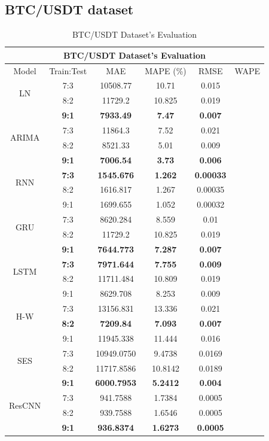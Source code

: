\documentclass{ieeeojies}
\begin{document}
\subsection{BTC/USDT dataset} 
\begin{table}[H]
    \centering
    \begin{tabular}{|c|c|c|c|c|c|}
         \hline
         \multicolumn{6}{|c|}{\textbf{BTC/USDT Dataset's Evaluation}}\\
         \hline
         \centering Model & Train:Test & MAE & MAPE (\%) & RMSE & WAPE\\
         \hline
         \multirow{2}{*}{LN} & 7:3 & 10508.77 & 10.71 & 0.015 \\ & 8:2 & 11729.2 & 10.825 & 0.019 \\ & \textbf{9:1} & \textbf{7933.49} & \textbf{7.47} & \textbf{0.007}\\
         \hline
         \multirow{2}{*}{ARIMA} & 7:3&11864.3&7.52&0.021\\ & 8:2&8521.33&5.01&0.009 \\ & \textbf{9:1} & \textbf{7006.54} & \textbf{3.73} & \textbf{0.006}\\
         \hline
         \multirow{2}{*}{RNN} & \textbf{7:3}	& \textbf{1545.676} & \textbf{1.262} & \textbf{0.00033} \\ & 8:2 & 1616.817 & 1.267 & 0.00035 \\ & 9:1 & 1699.655  & 1.052 & 0.00032\\
         \hline
         \multirow{2}{*}{GRU} & 7:3 &  8620.284 &  8.559 & 0.01 \\ & 8:2 &  11729.2 & 10.825 & 0.019 \\ & \textbf{9:1} & \textbf{7644.773}  & \textbf{7.287} & \textbf{0.007}\\
         \hline
         \multirow{2}{*}{LSTM} & \textbf{7:3}	& \textbf{7971.644} & \textbf{7.755} & \textbf{0.009} \\ & 8:2 & 11711.484 & 10.809 & 0.019 \\ & 9:1 & 8629.708 & 8.253 & 0.009\\
         \hline
         \multirow{2}{*}{H-W} & 7:3 & 13156.831&13.336 & 0.021 \\ & \textbf{8:2} &	\textbf{7209.84} & \textbf{7.093} & \textbf{0.007} \\ & 9:1 &11945.338	&11.444&0.016\\
         \hline
         \multirow{2}{*}{SES} & 7:3 & 10949.0750 & 9.4738 & 0.0169 \\ & 8:2 & 11717.8586 &10.8142 & 0.0189 \\ & \textbf{9:1} &  	\textbf{6000.7953} &	\textbf{5.2412} & 	\textbf{0.004} \\
         \hline
         \multirow{2}{*}{ResCNN} & 7:3 & 941.7588 &  1.7384 &  0.0005 \\ & 8:2 & 939.7588 &  1.6546 &  0.0005 \\ & \textbf{9:1} & \textbf{936.8374} & \textbf{1.6273} & \textbf{0.0005}\\
         \hline
    \end{tabular}
    \caption{BTC/USDT Dataset's Evaluation}
    \label{btcresult}
\end{table}
\end{document}
